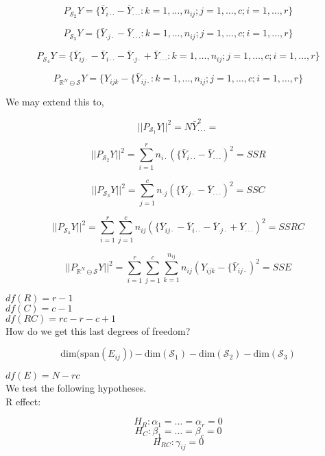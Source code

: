\documentclass[11pt,fleqn]{book} %
\begin{document}
		$$P_{\mathcal{S}_2} Y = \{\bar{Y}_{i \cdot \cdot} - \bar{Y}_{\cdot \cdot \cdot} :k = 1, \dots, n_{ij}; j = 1, \dots, c; i = 1, \dots, r \} $$

		$$P_{\mathcal{S}_3} Y = \{\bar{Y}_{\cdot j \cdot} - \bar{Y}_{\cdot \cdot \cdot} :k = 1, \dots, n_{ij}; j = 1, \dots, c; i = 1, \dots, r \}$$ 

		$$P_{\mathcal{S}_4} Y = \{\bar{Y}_{ij \cdot}  - \bar{Y}_{i \cdot \cdot} - \bar{Y}_{\cdot j \cdot} + \bar{Y}_{\cdot \cdot \cdot} :k = 1, \dots, n_{ij}; j = 1, \dots, c; i = 1, \dots, r \}$$


		$$ P_{\mathbb{R}^N \ominus\mathcal{S}} Y = \{Y_{ij k} - \{\bar{Y}_{ij \cdot}:k = 1, \dots, n_{ij}; j = 1, \dots, c; i = 1, \dots, r \}$$


We may extend this to, 


		$$||P_{\mathcal{S}_1} Y||^2 = N  \bar{Y}_{\cdot \cdot \cdot}^2 = $$

		$$||P_{\mathcal{S}_2} Y||^2 = \sum^r_{i=1} n_{i\cdot}  (\{\bar{Y}_{i \cdot \cdot} - \bar{Y}_{\cdot \cdot \cdot})^2 = SSR$$

		$$||P_{\mathcal{S}_3} Y||^2 = \sum^c_{j=1} n_{\cdot j}  (\{\bar{Y}_{ \cdot j \cdot} - \bar{Y}_{\cdot \cdot \cdot})^2 = SSC$$

		$$||P_{\mathcal{S}_4} Y||^2 = \sum^r_{i=1}\sum^c_{j=1} n_{ij}  (\{\bar{Y}_{ij \cdot}  - \bar{Y}_{i \cdot \cdot} - \bar{Y}_{\cdot j \cdot} + \bar{Y}_{\cdot \cdot \cdot})^2 = SSRC$$

		$$||P_{\mathbb{R}^N\ominus \mathcal{S}} Y||^2 = \sum^r_{i=1} \sum^c_{j=1} \sum^{n_{ij}}_{k=1} n_{ij}   (Y_{ij k} - \{\bar{Y}_{ij \cdot})^2 = SSE$$


$df(R) = r- 1$\\
$df(C) = c - 1$\\
$df(RC) = rc - r - c + 1$\\


How do we get this last degrees of freedom? 

	$$\text{dim(span}(E_{ij})) - \text{dim}(\mathcal{S}_1) - \text{dim} (\mathcal{S}_2 ) -  \text{dim}(\mathcal{S}_3) $$


$df(E) = N - rc$\\


We test the following hypotheses. \\

R effect:

		$$H_R: \alpha_1 = \dots = \alpha_r = 0$$
		$$H_C: \beta_1 = \dots = \beta_c = 0$$
		$$H_{RC}: \gamma_{ij} = 0$$
\end{document}
